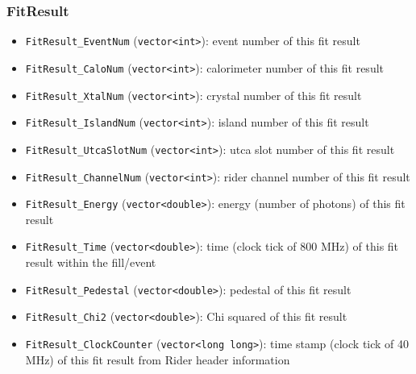 \subsubsection*{FitResult}
\begin{itemize}
\item \verb+FitResult_EventNum+ (\verb+vector<int>+): event number of this fit result
\item \verb+FitResult_CaloNum+ (\verb+vector<int>+): calorimeter number of this fit result
\item \verb+FitResult_XtalNum+ (\verb+vector<int>+): crystal number of this fit result
\item \verb+FitResult_IslandNum+ (\verb+vector<int>+): island number of this fit result
\item \verb+FitResult_UtcaSlotNum+ (\verb+vector<int>+): utca slot number of this fit result
\item \verb+FitResult_ChannelNum+ (\verb+vector<int>+): rider channel number of this fit result
\item \verb+FitResult_Energy+ (\verb+vector<double>+): energy (number of photons) of this fit result
\item \verb+FitResult_Time+ (\verb+vector<double>+): time (clock tick of 800 MHz) of this fit result within the fill/event
\item \verb+FitResult_Pedestal+ (\verb+vector<double>+): pedestal of this fit result
\item \verb+FitResult_Chi2+ (\verb+vector<double>+): Chi squared of this fit result
\item \verb+FitResult_ClockCounter+ (\verb+vector<long long>+): time stamp (clock tick of 40 MHz) of this fit result from Rider header information
\end{itemize}

